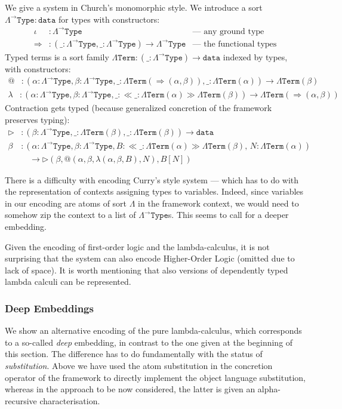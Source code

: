 \documentclass[copyright,creativecommons]{eptcs}
\newcounter{s}
\newcommand{\absort}[2]{\ensuremath{\ll\!\!#1\!\!\gg #2}}
\newcommand{\dta}{\texttt{data}}
\newcommand{\LATy}{\ensuremath{\Lambda^{\rightarrow}\texttt{Type}}}
\newcommand{\LTrm}{\ensuremath{\Lambda\texttt{Term}}}
\begin{document}
We give a system in Church's monomorphic style. We introduce a sort $\LATy : \dta$ for types with constructors:
\begin{align*}
\iota &: \LATy &  \text{— any ground type}\\
\Rightarrow &: (\_ : \LATy,\_ : \LATy) \rightarrow \LATy & \text{— the functional types}
\end{align*}
%
Typed terms is a sort family $\LTrm : (\_ : \LATy) \rightarrow \dta$ indexed by types, with
constructors:
%
\begin{align*}
@ &: (\alpha : \LATy, \beta : \LATy, \_ : \LTrm(\Rightarrow(\alpha, \beta)),\_ : \LTrm(\alpha)) \rightarrow \LTrm(\beta)
\end{align*}
\begin{align*}
\lambda &: (\alpha:\LATy, \beta:\LATy,\_:\absort{\_{:}\LTrm(\alpha)}{\LTrm(\beta)}) \rightarrow \LTrm(\Rightarrow(\alpha, \beta))
\end{align*}
%
Contraction gets typed (because generalized concretion of the framework preserves typing):
%
\begin{align*}
\triangleright &: (\beta : \LATy, \_ : \LTrm(\beta), \_ : \LTrm(\beta)) \rightarrow \dta\\
\beta &: (\alpha : \LATy, \beta : \LATy, B : \absort{\_{:} \LTrm(\alpha)}{\LTrm(\beta)},\, N : \LTrm(\alpha)) \\
    & \quad \rightarrow \triangleright(\beta,@(\alpha,\beta,\lambda(\alpha,\beta,B),N), B[N])
\end{align*}

There is a difficulty with encoding Curry’s style system --- which has to do with the representation of contexts assigning types to variables. Indeed, since variables in our encoding are atoms of sort $\Lambda$ in the framework context, we would need to somehow zip the context to a list of $\LATy$s. This seems to call for a deeper embedding.%


Given the encoding of first-order logic and the lambda-calculus, it is not surprising that the system can also encode Higher-Order Logic (omitted due to lack of space). It is worth mentioning that also versions of dependently typed lambda calculi can be represented.

\subsubsection*{Deep Embeddings}
\label{sec:deep-embeddings}
We show an alternative encoding of the pure lambda-calculus, which corresponds to a so-called \emph{deep} embedding, in contrast to the one given at the beginning of this section. The difference has to do fundamentally with the status of \emph{substitution}. Above we have used the atom substitution in the concretion operator of the framework to directly implement the object language substitution, whereas in the approach to be now considered, the latter is given an alpha-recursive characterisation.
\end{document}
